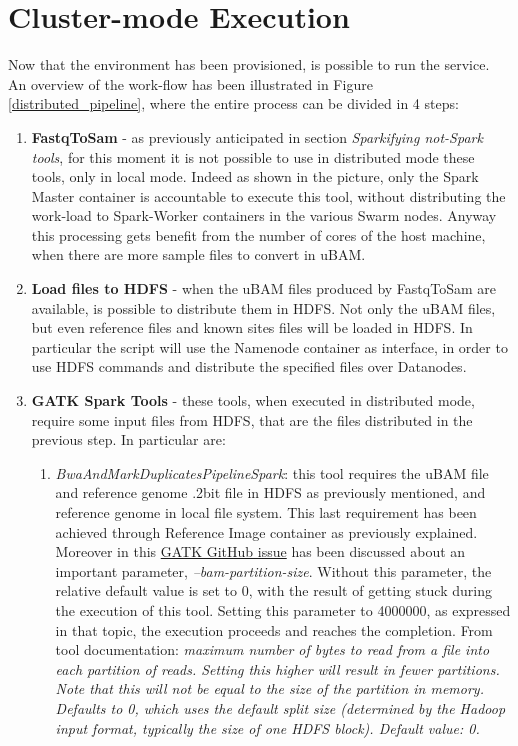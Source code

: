 \section{Cluster-mode Execution}
Now that the environment has been provisioned, is possible to run the service. An overview of the work-flow has been illustrated in Figure \ref{distributed_pipeline}, where the entire process can be divided in 4 steps:
\begin{enumerate}
  \item \textbf{FastqToSam} - as previously anticipated in section \textit{Sparkifying not-Spark tools}, for this moment it is not possible to use in distributed mode these tools, only in local mode. Indeed as shown in the picture, only the Spark Master container is accountable to execute this tool, without distributing the work-load to Spark-Worker containers in the various Swarm nodes. Anyway this processing gets benefit from the number of cores of the host machine, when there are more sample files to convert in uBAM.
  \item \textbf{Load files to HDFS} - when the uBAM files produced  by FastqToSam are available, is possible to distribute them in HDFS. Not only the uBAM files, but even reference files and known sites files will be loaded in HDFS. In particular the script will use the Namenode container as interface, in order to use HDFS commands and distribute the specified files over Datanodes.
  \item \textbf{GATK Spark Tools} - these tools, when executed in distributed mode, require some input files from HDFS, that are the files distributed in the previous step. In particular are:
  \begin{enumerate}
  	\item \textit{BwaAndMarkDuplicatesPipelineSpark}: this tool requires the uBAM file and reference genome .2bit file in HDFS as previously mentioned, and reference genome in local file system. This last requirement has been achieved through Reference Image container as previously explained. Moreover in this \href{https://github.com/broadinstitute/gatk/issues/3186}{GATK GitHub issue} has been discussed about an important parameter, \textit{--bam-partition-size}. Without this parameter, the relative default value is set to 0, with the result of getting stuck during the execution of this tool. Setting this parameter to 4000000, as expressed in that topic, the execution proceeds and reaches the completion. From tool documentation: \textit{maximum number of bytes to read from a file into each partition of reads. Setting this higher will result in fewer partitions. Note that this will not be equal to the size of the partition in memory. Defaults to 0, which uses the default split size (determined by the Hadoop input format, typically the size of one HDFS block).  Default value: 0.}

\end{enumerate}
\end{enumerate}
